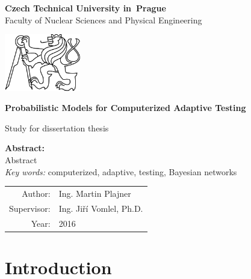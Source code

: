 \documentclass[a4paper,12pt,oneside]{report}
\newcommand{\cvut}{Czech Technical University in~Prague}
\newcommand{\fjfi}{Faculty of Nuclear Sciences and Physical Engineering}
\newcommand{\autor}{Ing. Martin Plajner}           %
\newcommand{\rok}{2016}                %
\newcommand{\vedouci}{Ing. Jiří Vomlel, Ph.D.}         %
\newcommand{\keyword}{computerized, adaptive, testing, Bayesian networks}       %
\newcommand{\abstrEN}{Abstract}                  %
\begin{document}
\thispagestyle{empty}

\begin{center}
    \Large  \textbf{\cvut}\\[2mm] \fjfi 
		
    \vspace{10mm}

      \vspace{1mm}
    
		\begin{center}
		{\includegraphics[height=25mm]{cvutlogobw.png}}
		\end{center}
    \vspace{7mm}

   \huge \textbf{Probabilistic Models for Computerized Adaptive Testing}
	
   \vspace{2mm}
   \Large Study for dissertation thesis
	
	\normalsize
  {\center \textbf{Abstract:} } \\
	\abstrEN  \\
  {\em Key words:} 
	{\keyword}
   
	\vfill
	
   {\large
    \begin{tabular}{rl}
    Author: & \autor\\
    Supervisor: & \vedouci\\
    Year: & \rok
    \end{tabular}
   }
\end{center}

\newpage  
\tableofcontents 

\newpage %

\chapter*{Introduction}  
 






\end{document}
